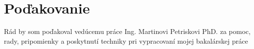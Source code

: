 \documentclass[./main.tex]{subfiles} %
\begin{document}
    \mbox{}
\vfill
\section*{Poďakovanie}
\bigskip
\par Rád by som poďakoval vedúcemu práce Ing. Martinovi Petriskovi PhD. za pomoc, rady, pripomienky a poskytnutí techniky pri vypracovaní mojej bakalárskej práce
\bigskip
\bigskip
\end{document}
